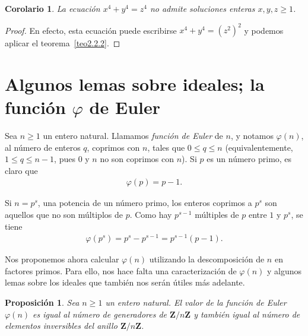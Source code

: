 \documentclass[oneside,bibtotoc,leqno,spanish]{amsbook}
\newcommand{\ZZ}{\mathbf{Z}}
\numberwithin{equation}{section}
\theoremstyle{defi}
\theoremstyle{note}
\newtheorem{proposition}{Proposici\'on}
\newtheorem*{corollary*}{Corolario}
\theoremstyle{rem}
\numberwithin{theorem}{section}
\numberwithin{proposition}{section}
\numberwithin{definition}{section}
\numberwithin{lemma}{section}
\numberwithin{corollary}{section}
\numberwithin{example}{section}
\numberwithin{footnote}{section}%
\begin{document}
\begin{corollary*}
La ecuaci\'on $x^{4}+y^{4}=z^{4}$ no admite soluciones enteras $x,y,z\geq 1$.
\end{corollary*}

\begin{proof}
En efecto, esta ecuaci\'on puede escribirse $x^{4}+y^{4}=(z^{2})^{2}$ y podemos aplicar el teorema~\ref{teo2.2.2}.
\end{proof}

\section{Algunos lemas sobre ideales; la funci\'on $\varphi$ de Euler}\label{sec1.3}

Sea $n\geq 1$ un entero natural. Llamamos {\em funci\'on de Euler} de
$n$, y notamos $\varphi(n)$, al n\'umero de enteros $q$, coprimos con $n$, tales que
$0\leq q\leq n$ (equivalentemente, $1\leq q\leq n-1$, pues $0$ y $n$ no son
coprimos con $n$). Si $p$ es un n\'umero primo, es claro que
\begin{gather}
\varphi(p) = p-1.
\end{gather}

Si $n = p^{s}$, una potencia de un n\'umero primo, los enteros coprimos a $p^{s}$ son
aquellos que no son m\'ultiplos de $p$. Como hay $p^{s-1}$ m\'ultiples de $p$ entre $1$ y
$p^{s}$, se tiene
\begin{gather}\label{eq-1.3-2}
\varphi(p^{s}) = p^{s} - p^{s-1} = p^{s-1}(p-1).
\end{gather}

Nos proponemos ahora calcular $\varphi(n)$ utilizando la descomposici\'on de $n$
en factores primos. Para ello, nos hace falta una caracterizaci\'on de $\varphi(n)$ y
algunos lemas sobre los ideales que tambi\'en nos ser\'an \'utiles m\'as adelante.

\begin{proposition}\label{prop1.3.1}
Sea $n\geq 1$ un entero natural. El valor de la funci\'on de Euler $\varphi(n)$ es igual al n\'umero
de generadores de $\ZZ/n\ZZ$ y tambi\'en igual al n\'umero de elementos inversibles del
anillo $\ZZ/n\ZZ$.
\end{proposition}
\end{document}
